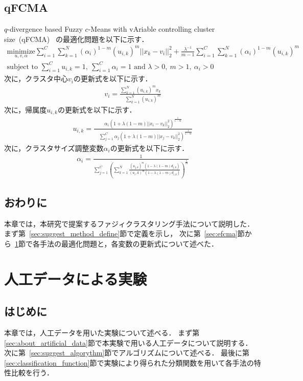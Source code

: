 \documentclass[a4j,12pt,dvipdfmx,oneside]{jsbook}
\theoremstyle{definition}
\begin{document}
 \section{qFCMA}\label{sec:qfcma}
 
 $q$-divergence based Fuzzy $c$-Means with vAriable controlling cluster size~(qFCMA)~\cite{qFCMA}
 の最適化問題を以下に示す．
 \begin{align}
  \underset{u,v,\alpha}{\text{minimize}}
  \sum_{i=1}^C\sum_{k=1}^N(\alpha_{i})^{1-m}(u_{i,k})^m||x_k-v_i||_2^2
  +\frac{\lambda^{-1}}{m-1}\sum_{i=1}^C\sum_{k=1}^N(\alpha_{i})^{1-m}(u_{i,k})^m\\
  {\text{subject to }}\sum_{i=1}^Cu_{i,k}=1,~\sum_{i=1}^C\alpha_{i}=1{\text{ and }}\lambda>0,~m>1,~\alpha_{i}>0
 \end{align}
 次に，クラスタ中心$v_{i}$の更新式を以下に示す．
 \begin{align}
  v_{i}=\frac{\sum_{k=1}^N(u_{i,k})^mx_{k}}{\quad\sum_{k=1}^N(u_{i,k})^{m}}
 \end{align}
 次に，帰属度$u_{i,k}$の更新式を以下に示す．
 \begin{align}
  u_{i,k}=\frac{\alpha_{i}(1+\lambda(1-m)||x_i-v_k||_2^2)^\frac{1}{1-m}}{\quad\sum_{j=1}^C\alpha_{j}(1+\lambda(1-m)||x_j-v_k||_2^2)^\frac{1}{1-m}}
 \end{align}
 次に，クラスタサイズ調整変数$\alpha_{i}$の更新式を以下に示す．
 \begin{align}
  \alpha_{i}=\frac{1}{\sum_{j=1}^C\left(\sum_{k=1}^N\frac{(u_{j,k})^m(1-\lambda(1-m)d_{j,k})}{(u_i,k)^m(1-\lambda(1-m)d_{i,k})}\right)^{\frac{1}{m}}}
 \end{align}

 \section{おわりに}\label{sec:suggest_method_summary}
 本章では，本研究で提案するファジィクラスタリング手法について説明した．
 まず第~\ref{sec:suggest_method_define}節で定義を示し，
 次に第~\ref{sec:efcma}節から~\ref{sec:qfcma}節で各手法の最適化問題と，各変数の更新式について述べた．
 
 
 
\chapter{人工データによる実験}\label{chap:artificial_data}

 \section{はじめに}\label{sec:artificial_data_intro}
 本章では，人工データを用いた実験について述べる．
 まず第\ref{sec:about_artificial_data}節で本実験で用いる人工データについて説明する．
 次に第~\ref{sec:suggest_algorythm}節でアルゴリズムについて述べる．
 最後に第\ref{sec:classification_function}節で実験により得られた分類関数を用いて各手法の特性比較を行う．
 
\end{document}
